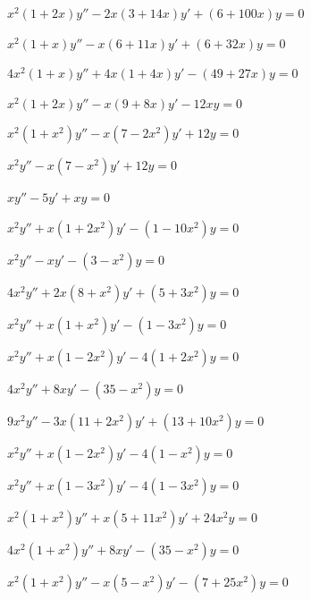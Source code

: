\begin{exerciselist}
\item\label{exer:7.7.19}$x^2(1+2x)y''-2x(3+14x)y'+(6+100x)y=0$

\item\label{exer:7.7.20}$x^2(1+x)y''-x(6+11x)y'+(6+32x)y=0$

\item\label{exer:7.7.21}$4x^2(1+x)y''+4x(1+4x)y'-(49+27x)y=0$

\item\label{exer:7.7.22}$x^2(1+2x)y''-x(9+8x)y'-12xy=0$


\item\label{exer:7.7.23}$x^2(1+x^2)y''-x(7-2x^2)y'+12y=0$

\item\label{exer:7.7.24}$x^2y''-x(7-x^2)y'+12y=0$

\item\label{exer:7.7.25}$xy''-5y'+xy=0$

\item\label{exer:7.7.26}$x^2y''+x(1+2x^2)y'-(1-10x^2)y=0$

\item\label{exer:7.7.27}$x^2y''-xy'-(3-x^2)y=0$

\item\label{exer:7.7.28}$4x^2y''+2x(8+x^2)y'+(5+3x^2)y=0$

\item\label{exer:7.7.29}$x^2y''+x(1+x^2)y'-(1-3x^2)y=0$

\item\label{exer:7.7.30}$x^2y''+x(1-2x^2)y'-4(1+2x^2)y=0$

\item\label{exer:7.7.31}$4x^2y''+8xy'-(35-x^2)y=0$

\item\label{exer:7.7.32}$9x^2y''-3x(11+2x^2)y'+(13+10x^2)y=0$

\item\label{exer:7.7.33}$x^2y''+x(1-2x^2)y'-4(1-x^2)y=0$

\item\label{exer:7.7.34}$x^2y''+x(1-3x^2)y'-4(1-3x^2)y=0$

\item\label{exer:7.7.35}$x^2(1+x^2)y''+x(5+11x^2)y'+24x^2y=0$

\item\label{exer:7.7.36}$4x^2(1+x^2)y''+8xy'-(35-x^2)y=0$

\item\label{exer:7.7.37}$x^2(1+x^2)y''-x(5-x^2)y'-(7+25x^2)y=0$


\end{exerciselist}
